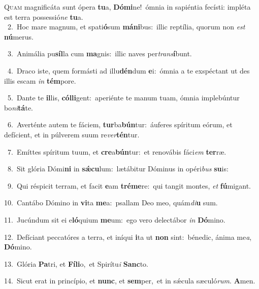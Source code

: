 \lettrine{\initial\textcolor{\initialcolor}{Q}}{uam} magnificáta sunt ópera \textbf{tu}\-a, \textbf{Dó}\-\textbf{mi}ne!~\star ómnia in sapiéntia fecísti: impléta est terra possessió\textit{ne} \textbf{tu}\-a.\\
{\numbfont\textcolor{\numbcolor}{~2.}}~Hoc mare magnum, et spati\-\textbf{ó}\-sum \textbf{má}\-\textbf{ni}bus:~\star illic reptília, quorum non \textit{est} \textbf{nú}\-merus.\par
{\numbfont\textcolor{\numbcolor}{~3.}}~Animália pu\-\textbf{síl}\-la cum \textbf{ma}\-gnis:~\star illic naves per\-\textit{trans}\-\textbf{í}bunt.\par
{\numbfont\textcolor{\numbcolor}{~4.}}~Draco iste, quem formásti ad illu\-\textbf{dén}\-dum \textbf{e}\-i:~\star ómnia a te exspéctant ut des illis escam \textit{in} \textbf{tém}\-pore.\par
{\numbfont\textcolor{\numbcolor}{~5.}}~Dante te \textbf{il}\-lis, \textbf{cól}\-\textbf{li}gent:~\star aperiénte te manum tuam, ómnia implebúntur bo\-\textit{ni}\-\textbf{tá}te.\par
{\numbfont\textcolor{\numbcolor}{~6.}}~Averténte autem te fáciem, \textbf{tur}\-ba\-\textbf{bún}\-tur:~\star áuferes spíritum eórum, et defícient, et in púlverem suum re\-\textit{ver}\-\textbf{tén}tur.\par
{\numbfont\textcolor{\numbcolor}{~7.}}~Emíttes spíritum tuum, et \textbf{cre}\-a\-\textbf{bún}\-tur:~\star et renovábis fáci\textit{em} \textbf{ter}\-ræ.\par
{\numbfont\textcolor{\numbcolor}{~8.}}~Sit glória Dómi\textbf{ni} in \textbf{sǽ}\-\textbf{cu}lum:~\star lætábitur Dóminus in opéri\textit{bus} \textbf{su}\-is:\par
{\numbfont\textcolor{\numbcolor}{~9.}}~Qui réspicit terram, et facit \textbf{e}\-am \textbf{tré}\-\textbf{me}re:~\star qui tangit montes, \textit{et} \textbf{fú}\-migant.\par
{\numbfont\textcolor{\numbcolor}{10.}}~Cantábo Dómino in \textbf{vi}\-ta \textbf{me}\-a:~\star psallam Deo meo, quám\-\textit{di}\-\textbf{u} sum.\par
{\numbfont\textcolor{\numbcolor}{11.}}~Jucúndum sit ei e\-\textbf{ló}\-quium \textbf{me}\-um:~\star ego vero delectábor \textit{in} \textbf{Dó}\-mino.\par
{\numbfont\textcolor{\numbcolor}{12.}}~Defíciant peccatóres a terra, et iníqui \textbf{i}\-ta ut \textbf{non} sint:~\star bénedic, ánima me\-\textit{a}\-, \textbf{Dó}\-mino.\par
{\numbfont\textcolor{\numbcolor}{13.}}~Glória \textbf{Pa}\-tri, et \textbf{Fí}\-\textbf{li}o,~\star et Spirítu\textit{i} \textbf{Sanc}\-to.\par
{\numbfont\textcolor{\numbcolor}{14.}}~Sicut erat in princípio, et \textbf{nunc}\-, et \textbf{sem}\-per,~\star et in sǽcula sæculó\-\textit{rum}\-. \textbf{A}\-men.\par
